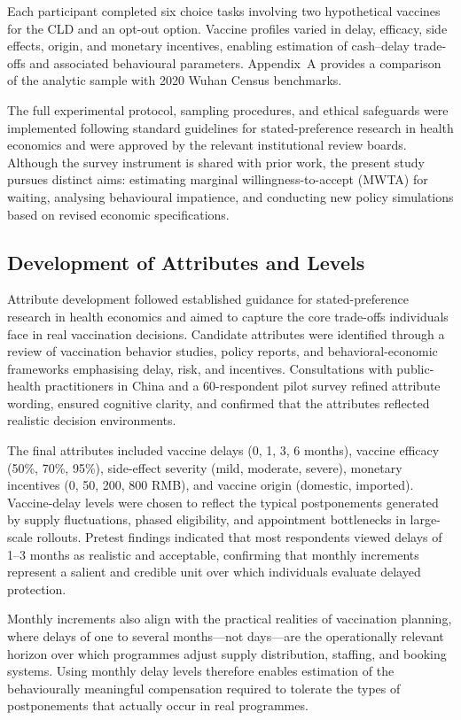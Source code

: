 \documentclass[12pt]{article}
\begin{document}
Each participant completed six choice tasks involving two hypothetical vaccines for the CLD 
and an opt-out option. Vaccine profiles varied in delay, efficacy, side effects, origin, and 
monetary incentives, enabling estimation of cash–delay trade-offs and associated behavioural 
parameters. Appendix~A provides a comparison of the analytic sample with 2020 Wuhan Census 
benchmarks.

The full experimental protocol, sampling procedures, and ethical safeguards were implemented
following standard guidelines for stated-preference research in health economics and were
approved by the relevant institutional review boards.
 Although the survey instrument is shared with prior work, the present 
study pursues distinct aims: estimating marginal willingness-to-accept (MWTA) for waiting, 
analysing behavioural impatience, and conducting new policy simulations based on revised 
economic specifications.

\subsection{Development of Attributes and Levels}

Attribute development followed established guidance for stated-preference research in health 
economics and aimed to capture the core trade-offs individuals face in real vaccination 
decisions. Candidate attributes were identified through a review of vaccination behavior 
studies, policy reports, and behavioral-economic frameworks emphasising delay, risk, and 
incentives. Consultations with public-health practitioners in China and a 60-respondent pilot 
survey refined attribute wording, ensured cognitive clarity, and confirmed that the attributes 
reflected realistic decision environments.

The final attributes included vaccine delays (0, 1, 3, 6 months), vaccine efficacy (50\%, 70\%, 
95\%), side-effect severity (mild, moderate, severe), monetary incentives (0, 50, 200, 800 RMB), 
and vaccine origin (domestic, imported). Vaccine-delay levels were chosen to reflect the 
typical postponements generated by supply fluctuations, phased eligibility, and appointment 
bottlenecks in large-scale rollouts. Pretest findings indicated that most respondents viewed 
delays of 1--3 months as realistic and acceptable, confirming that monthly increments 
represent a salient and credible unit over which individuals evaluate delayed protection.

Monthly increments also align with the practical realities of vaccination planning, where 
delays of one to several months—not days—are the operationally relevant horizon over which 
programmes adjust supply distribution, staffing, and booking systems. Using monthly delay 
levels therefore enables estimation of the behaviourally meaningful compensation required to 
tolerate the types of postponements that actually occur in real programmes.
\end{document}
